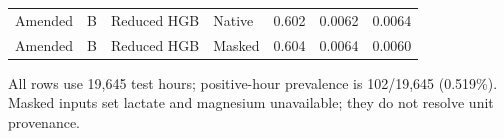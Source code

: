 \begin{table}[htbp]
\begin{tabular}{llllrrr}
Amended & B & Reduced HGB & Native & 0.602 & 0.0062 & 0.0064 \\
Amended & B & Reduced HGB & Masked & 0.604 & 0.0064 & 0.0060 \\
\bottomrule
\end{tabular}
\par\vspace{3pt}\begin{minipage}{\linewidth}\footnotesize All rows use 19,645 test hours; positive-hour prevalence is 102/19,645 (0.519\%). Masked inputs set lactate and magnesium unavailable; they do not resolve unit provenance.\end{minipage}
\end{table}
